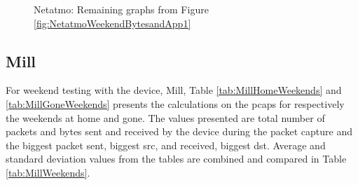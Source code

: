 \begin{figure}[H]
\begin{subfigure}[b]{0.47\textwidth}
    \end{subfigure}
   \begin{subfigure}[b]{0.47\textwidth}
    \end{subfigure}
    \begin{subfigure}[b]{0.47\textwidth}
    \end{subfigure}
    \begin{subfigure}[b]{0.47\textwidth}
    \end{subfigure}
    \hspace{0.6cm}
    \begin{subfigure}[b]{0.47\textwidth}
    \end{subfigure}
    \caption{Netatmo: Remaining graphs from Figure \ref{fig:NetatmoWeekendBytesandApp1}}
    \label{fig:NetatmoWeekendBytesandApp2}
\end{figure}

\subsection{Mill}
For weekend testing with the device, Mill, Table \ref{tab:MillHomeWeekends} and \ref{tab:MillGoneWeekends} presents the calculations on the pcaps for respectively the weekends at home and gone. The values presented are total number of packets and bytes sent and received by the device during the packet capture and the biggest packet sent, biggest src, and received, biggest dst. Average and standard deviation values from the tables are combined and compared in Table \ref{tab:MillWeekends}. 

